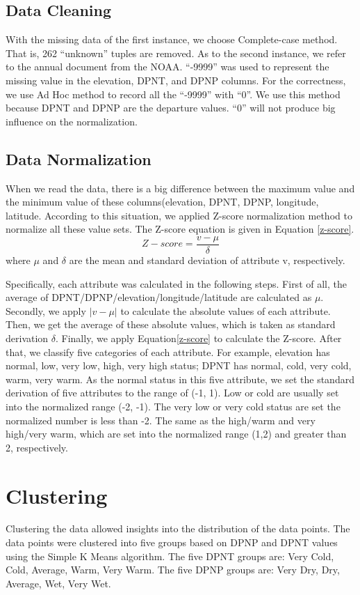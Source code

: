\documentclass[11pt]{article}
\begin{document}
\subsection{Data Cleaning}
With the missing data of the first instance, we choose Complete-case method\cite{han2006data}. That is, 262 ``unknown'' tuples are removed. As to the second instance, we refer to the annual document from the NOAA. ``-9999'' was used to represent the missing value in the elevation, DPNT, and DPNP columns. For the correctness, we use Ad Hoc method to record all the ``-9999'' with ``0''. We use this method because DPNT and DPNP are the departure values. ``0'' will not produce big influence on the normalization.
\subsection{Data Normalization}
When we read the data, there is a big difference between the maximum value and the minimum value of these columns(elevation, DPNT, DPNP, longitude, latitude. According to this situation, we applied Z-score normalization method to normalize all these value sets. The Z-score equation is given in Equation \eqref{z-score}.
\begin{equation}
Z-score = \frac{v-\mu}{\delta} \label{z-score}
\end{equation}
where $\mu$ and $\delta$ are the mean and standard deviation of attribute v, respectively.

Specifically, each attribute was calculated in the following steps. First of all, the average of DPNT/DPNP/elevation/longitude/latitude are calculated as $\mu$. Secondly, we apply $|v-\mu|$ to calculate the absolute values of each attribute. Then, we get the average of these absolute values, which is taken as standard derivation $\delta$. Finally, we apply Equation\eqref{z-score} to calculate the Z-score.
After that, we classify five categories of each attribute. For example, elevation has normal, low, very low, high, very high status; DPNT has normal, cold, very cold, warm, very warm. As the normal status in this five attribute, we set the standard derivation of five attributes to the range of (-1, 1). Low or cold are usually set into the normalized range (-2, -1). The very low or very cold status are set the normalized number is less than -2. The same as the high/warm and very high/very warm, which are set into the normalized range (1,2) and greater than 2, respectively.

\section{Clustering}
Clustering the data allowed insights into the distribution of the data points. The data points were clustered into five groups based on DPNP and DPNT values using the Simple K Means algorithm. The five DPNT groups are: Very Cold, Cold, Average, Warm, Very Warm. The five DPNP groups are: Very Dry, Dry, Average, Wet, Very Wet. 
\end{document}
